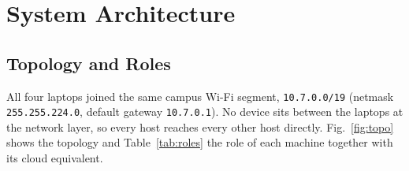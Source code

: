 \documentclass[conference,a4paper]{IEEEtran}
\newcommand{\code}[1]{\texttt{#1}}
\begin{document}
\section{System Architecture}
\label{sec:arch}

\subsection{Topology and Roles}
All four laptops joined the same campus Wi-Fi segment, \code{10.7.0.0/19}
(netmask \code{255.255.224.0}, default gateway \code{10.7.0.1}). No device sits between the
laptops at the network layer, so every host reaches every other host directly. Fig.~\ref{fig:topo}
shows the topology and Table~\ref{tab:roles} the role of each machine together with its cloud
equivalent.
\end{document}
